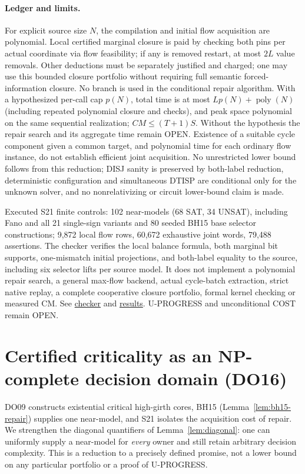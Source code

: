 \documentclass[11pt]{article}
\begin{document}
\paragraph{Ledger and limits.}
For explicit source size $N$, the compilation and initial flow acquisition are polynomial. Local certified marginal closure is paid by checking both pins per actual coordinate via flow feasibility; if any is removed restart, at most $2L$ value removals. Other deductions must be separately justified and charged; one may use this bounded closure portfolio without requiring full semantic forced-information closure. No branch is used in the conditional repair algorithm. With a hypothesized per-call cap $p(N)$, total time is at most $L p(N)+\operatorname{poly}(N)$ (including repeated polynomial closure and checks), and peak space polynomial on the same sequential realization; $CM\le(T+1)S$. Without the hypothesis the repair search and its aggregate time remain OPEN. Existence of a suitable cycle component given a common target, and polynomial time for each ordinary flow instance, do not establish efficient joint acquisition. No unrestricted lower bound follows from this reduction; DISJ sanity is preserved by both-label reduction, deterministic configuration and simultaneous DTISP are conditional only for the unknown solver, and no nonrelativizing or circuit lower-bound claim is made.

Executed S21 finite controls: 102 near-models (68 SAT, 34 UNSAT), including Fano and all 21 single-sign variants and 80 seeded BH15 base selector constructions; 9,872 local flow rows, 60,672 exhaustive joint words, 79,488 assertions. The checker verifies the local balance formula, both marginal bit supports, one-mismatch initial projections, and both-label equality to the source, including six selector lifts per source model. It does not implement a polynomial repair search, a general max-flow backend, actual cycle-batch extraction, strict native replay, a complete cooperative closure portfolio, formal kernel checking or measured CM. See \href{https://github.com/j15marti/pnp/commit/ab057271e1106f13482e8d7e679c7969bad46f33}{checker} and \href{https://github.com/j15marti/pnp/commit/96802c12424b3f0f55a39be3c8cc059a3857fd18}{results}. U-PROGRESS and unconditional COST remain OPEN.


\section{Certified criticality as an NP-complete decision domain (DO16)}\label{sec:do16}
DO09 constructs existential critical high-girth cores, BH15 (Lemma~\ref{lem:bh15-repair}) supplies one near-model, and S21 isolates the acquisition cost of repair. We strengthen the diagonal quantifiers of Lemma~\ref{lem:diagonal}: one can uniformly supply a near-model for \emph{every} owner and still retain arbitrary decision complexity. This is a reduction to a precisely defined promise, not a lower bound on any particular portfolio or a proof of U-PROGRESS.
\end{document}
